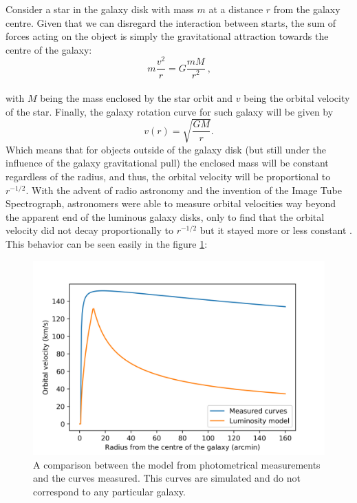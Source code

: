 Consider a star in the galaxy disk with mass $m$ at a distance $r$ from the galaxy centre.
Given that we can disregard the interaction between starts, the sum of forces acting on the object is simply the gravitational attraction towards the centre of the galaxy:
\begin{equation}
\label{heh}
m\frac{v^2}{r} = G \frac{mM}{r^2} \ \text{,}
\end{equation}\\
\vspace{-1mm}with $M$ being the mass enclosed by the star orbit and $v$ being the orbital velocity of the star. Finally, the galaxy rotation curve for such galaxy will be given by
\begin{equation}
v(r) = \sqrt{\frac{GM}{r}} \text{.}
\end{equation}%
Which means that for objects outside of the galaxy disk (but still under the influence of the galaxy gravitational pull) the enclosed mass will be constant regardless of the radius, and thus, the orbital velocity will be proportional to $r^{-1/2}$. With the advent of radio astronomy and the invention of the Image Tube Spectrograph, astronomers were able to measure orbital velocities way beyond the apparent end of the luminous galaxy disks, only to find that the orbital velocity did not decay proportionally to $r^{-1/2}$ but it stayed more or less constant\cite{h21Line} \cite{galactoDistance} \cite{veraFirst}. This behavior can be seen easily in the figure \ref{galaxyCurve}:%
\begin{figure}[ht]
    \centering
    \includegraphics[scale=0.8]{imag/galaxyRotCurv.png}
    \caption{A comparison between the model from photometrical measurements and the curves measured. This curves are simulated and do not correspond to any particular galaxy.}
    \label{galaxyCurve}
\end{figure}

